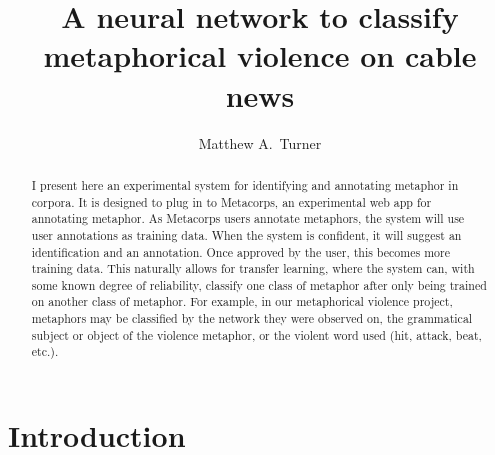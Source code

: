 \documentclass[11pt,letterpaper]{amsart}
\title{A neural network to classify metaphorical violence on
cable news}
\author{Matthew A.~Turner}
\begin{document}
\maketitle

\begin{abstract}
I present here an experimental system for identifying and annotating metaphor 
in corpora. It is designed to plug in to 
  Metacorps,
an experimental web app for annotating metaphor. As Metacorps users annotate metaphors,
the system will use user annotations as training data. When the system is 
confident, it will suggest an identification and an annotation. Once approved by the user, this becomes more training data. This naturally allows for transfer learning, where the system can, with some known degree of reliability, classify one class of metaphor after only being trained on another class of metaphor. For example, in our metaphorical violence project, metaphors may be classified by the network they were observed on, the grammatical subject or object of the violence metaphor, or the violent word used (hit, attack, beat, etc.).
\end{abstract}


\section{Introduction}\label{introduction}
\end{document}

